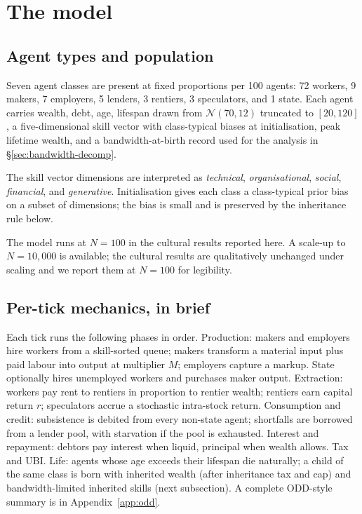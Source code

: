 \documentclass[11pt]{article}
\begin{document}
\section{The model}
\label{sec:model}

\subsection{Agent types and population}

Seven agent classes are present at fixed proportions per 100 agents:
72 workers, 9 makers, 7 employers, 5 lenders, 3 rentiers, 3
speculators, and 1 state. Each agent carries wealth, debt, age,
lifespan drawn from $\mathcal{N}(70, 12)$ truncated to $[20, 120]$,
a five-dimensional skill vector with class-typical biases at
initialisation, peak lifetime wealth, and a bandwidth-at-birth record
used for the analysis in \S\ref{sec:bandwidth-decomp}.

The skill vector dimensions are interpreted as \emph{technical},
\emph{organisational}, \emph{social}, \emph{financial}, and
\emph{generative}. Initialisation gives each class a class-typical
prior bias on a subset of dimensions; the bias is small and is
preserved by the inheritance rule below.

The model runs at $N = 100$ in the cultural results reported here.
A scale-up to $N = 10{,}000$ is available; the cultural results are
qualitatively unchanged under scaling and we report them at $N=100$
for legibility.

\subsection{Per-tick mechanics, in brief}

Each tick runs the following phases in order. Production: makers and
employers hire workers from a skill-sorted queue; makers transform
a material input plus paid labour into output at multiplier $M$;
employers capture a markup. State optionally hires unemployed
workers and purchases maker output. Extraction: workers pay rent
to rentiers in proportion to rentier wealth; rentiers earn capital
return $r$; speculators accrue a stochastic intra-stock return.
Consumption and credit: subsistence is debited from every non-state
agent; shortfalls are borrowed from a lender pool, with starvation if
the pool is exhausted. Interest and repayment: debtors pay interest
when liquid, principal when wealth allows. Tax and UBI. Life: agents
whose age exceeds their lifespan die naturally; a child of the same
class is born with inherited wealth (after inheritance tax and cap)
and bandwidth-limited inherited skills (next subsection).
A complete ODD-style summary is in Appendix~\ref{app:odd}.
\end{document}
